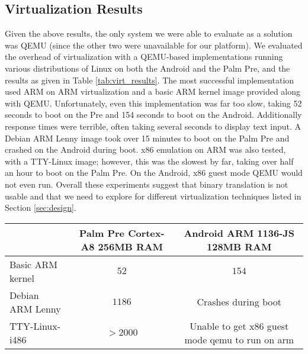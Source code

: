 \subsection{Virtualization Results}

Given the above results, the only system we were able to evaluate as a solution was QEMU (since the other two were unavailable for our platform).  We evaluated the overhead of virtualization with a QEMU-based implementations running various distributions of Linux on both the Android and the Palm Pre, and the results as given in Table \ref{tab:virt_results}. The most successful implementation used ARM on ARM virtualization and a basic ARM kernel image provided along with QEMU. Unfortunately, even this implementation was far too slow, taking 52 seconds to boot on the Pre and 154 seconds to boot on the Android. Additionally response times were terrible, often taking several seconds to display text input. A Debian ARM Lenny image took over 15 minutes to boot on the Palm Pre and crashed on the Android during boot. x86 emulation on ARM was also tested, with a TTY-Linux image; however, this was the slowest by far, taking over half an hour to boot on the Palm Pre. On the Android, x86 guest mode QEMU would not even run. Overall these experiments suggest that binary translation is not usable and that we need to explore for different virtualization techniques listed in Section \ref{sec:design}.

\begin{table*}[bth]
\begin{tabular}{|l|c|c|}
\hline & Palm Pre Cortex-A8 256MB RAM & Android ARM 1136-JS 128MB RAM \\ 
\hline Basic ARM kernel & $52$ & $154$ \\ [2pt]
 Debian ARM Lenny & $1186$ & Crashes during boot \\ [2pt]
 TTY-Linux-i486 & $>2000$ & Unable to get x86 guest mode qemu to run on arm \\[2pt]
\hline 
\end{tabular}
\caption{
Virtualization Results: Kernel Boot time in seconds
}
\label{tab:virt_results}
\end{table*}


